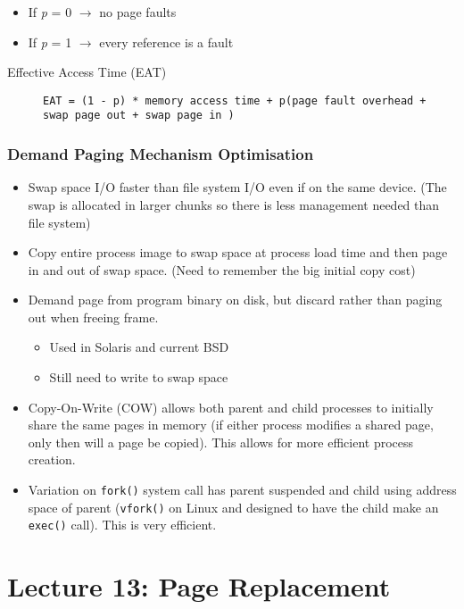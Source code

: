\documentclass{article}%
\begin{document}
\begin{itemize}
\item If \emph{p} = 0 \(\rightarrow\) no page faults
\item If \emph{p} = 1 \(\rightarrow\) every reference is a fault
\end{itemize}


\begin{description}
\item[{Effective Access Time (EAT)}] \texttt{EAT = (1 - p) * memory access time + p(page fault overhead + swap page out + swap page in )}
\end{description}
\subsubsection{Demand Paging Mechanism Optimisation}
\label{sec:org7cae0dd}
\begin{itemize}
\item Swap space I/O faster than file system I/O even if on the same device. (The swap is allocated in larger chunks so there is less management needed than file system)
\item Copy entire process image to swap space at process load time and then page in and out of swap space. (Need to remember the big initial copy cost)
\item Demand page from program binary on disk, but discard rather than paging out when freeing frame.
\begin{itemize}
\item Used in Solaris and current BSD
\item Still need to write to swap space
\end{itemize}
\item Copy-On-Write (COW) allows both parent and child processes to initially share the same pages in memory (if either process modifies a shared page, only then will a page be copied). This allows for more efficient process creation.
\item Variation on \texttt{fork()} system call has parent suspended and child using address space of parent (\texttt{vfork()} on Linux and designed to have the child make an \texttt{exec()} call). This is very efficient.
\end{itemize}

\maketitle
\section{Lecture 13: Page Replacement}
\end{document}
